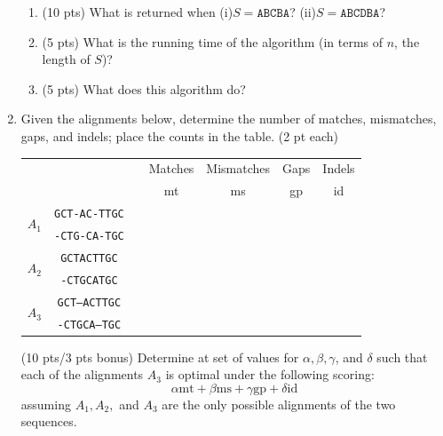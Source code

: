 \documentclass[11pt, oneside]{article}   	%
\begin{document}
\begin{enumerate}
\begin{enumerate}
\item (10 pts) What is returned when (i)$S=\texttt{ABCBA}$? (ii)$S=\texttt{ABCDBA}$?
\item (5 pts) What is the running time of the algorithm (in terms of $n$, the length of $S$)?
\item (5 pts) What does this algorithm do? 
\end{enumerate}

\clearpage

\item Given the alignments below, determine the number of matches, mismatches, gaps, and indels; place the counts in the table. (2 pt each)  

\begin{center}
\renewcommand{\arraystretch}{1}
\begin{tabular}{r|c|c|c|c|c|c|}
\multicolumn{1}{c}{} &\multicolumn{1}{c}{}  &  \multicolumn{1}{c}{} & \multicolumn{1}{c}{Matches} & \multicolumn{1}{c}{Mismatches} & \multicolumn{1}{c}{Gaps} & \multicolumn{1}{c}{Indels}\\
\multicolumn{1}{c}{} &\multicolumn{1}{c}{}  &  \multicolumn{1}{c}{} & \multicolumn{1}{c}{mt} & \multicolumn{1}{c}{ms} & \multicolumn{1}{c}{gp} & \multicolumn{1}{c}{id}\\
\cline{2-2} \cline{4-7} 
\multirow{2}{*}{$A_1$} & \texttt{GCT-AC-TTGC} & \hspace{2em} & \hspace{5em} & \hspace{5em} & \hspace{5em} & \hspace{5em} \\
& \texttt{-CTG-CA-TGC}  & & & & & \\
\cline{2-2} \cline{4-7} 
\multirow{2}{*}{$A_2$} & \texttt{GCTACTTGC} & & & & &\\
& \texttt{-CTGCATGC}  & & & & &\\
\cline{2-2} \cline{4-7} 
\multirow{2}{*}{$A_3$} & \texttt{GCT--ACTTGC}  & & & & &\\
& \texttt{-CTGCA--TGC} & & & & &\\
\cline{2-2} \cline{4-7} 
\end{tabular}
\end{center}

\dag (10 pts/3 pts bonus) Determine at set of values for $\alpha, \beta, \gamma$, and $\delta$ such that each of the alignments $A_3$ is optimal under the following scoring:
\[
\alpha\text{mt} + \beta\text{ms} + \gamma\text{gp} + \delta\text{id}
\]
assuming $A_1,A_2,$ and $A_3$ are the only possible alignments of the two sequences. 


\end{enumerate}
\end{document}
